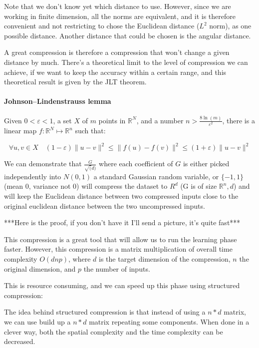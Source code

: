 \documentclass[11pt,a4paper]{article}
\begin{document}
	
	Note that we don't know yet which distance to use. However, since we are working in finite dimension, all the norms are equivalent, and it is therefore convenient and not restricting to chose the Euclidean distance ($L^2$ norm), as one possible distance. Another distance that could be chosen is the angular distance.
	
	A great compression is therefore a compression that won't change a given distance by much. There's a theoretical limit to the level of compression we can achieve, if we want to keep the accuracy within a certain range, and this theoretical result is given by the JLT theorem.
	
	
	\paragraph{Johnson–Lindenstrauss lemma}
	Given $0 < \varepsilon < 1$, a set $X$ of $m$ points in $\mathbb{R}^N$, and a number $n > \frac{8 \ln(m)}{\varepsilon^2}$, there is a linear map $f : \mathbb{R}^N \mapsto \mathbb{R}^n$ such that:
	
	\begin{equation}
		\forall u,v \in X \quad (1-\varepsilon)\|u-v\|^2 \leq \|f(u) - f(v)\|^2 \leq (1+\varepsilon)\|u-v\|^2
	\end{equation}
	

	We can demonstrate that $\frac{G}{\sqrt(d)}$ where each coefficient of $G$ is either picked independently into $N(0,1)$ a standard Gaussian random variable, or $\{-1,1\}$ (mean 0, variance not 0) will compress the dataset to $R^d$ (G is of size $\mathbb{R}^n,d$) and will keep the Euclidean distance between two compressed inputs close to the original euclidean distance between the two uncompressed inputs.
	
	***Here is the proof, if you don't have it I'll send a picture, it's quite fast***
	
	This compression is a great tool that will allow us to run the learning phase faster. However, this compression is a matrix multiplication of overall time complexity $O(dnp)$, where $d$ is the target dimension of the compression, $n$ the original dimension, and $p$ the number of inputs.  
	
	This is resource consuming, and we can speed up this phase using structured compression:
	
	The idea behind structured compression is that instead of using a $n*d$ matrix, we can use build up a $n*d$ matrix repeating some components. When done in a clever way, both the spatial complexity and the time complexity can be decreased.
	
\end{document}
